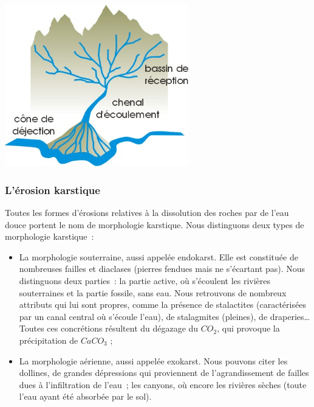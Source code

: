 \documentclass[a4paper,11pt]{article}
\begin{document}
\begin{center}
  \includegraphics[width=8cm]{Images/Erosion/torrent2.jpg}
\end{center}

\subsubsection{L'érosion karstique}

Toutes les formes d'érosions relatives à la dissolution des roches par de l'eau douce portent le nom de morphologie karstique.
Nous distinguons deux types de morphologie karstique~:
\begin{itemize}
  \item La morphologie souterraine, aussi appelée endokarst.
  Elle est constituée de nombreuses failles et diaclases (pierres fendues mais ne s'écartant pas).
  Nous distinguons deux parties~: la partie active, où s'écoulent les rivières souterraines et la partie fossile, sans eau.
  Nous retrouvons de nombreux attributs qui lui sont propres, comme la présence de stalactites (caractérisées par un canal central où s'écoule l'eau), de stalagmites (pleines), de draperies\ldots
  Toutes ces concrétions résultent du dégazage du $CO_2$, qui provoque la précipitation de $CaCO_3$ ;

  \item La morphologie aérienne, aussi appelée exokarst.
  Nous pouvons citer les dollines, de grandes dépressions qui proviennent de l'agrandissement de failles dues à l'infiltration de l'eau~; les canyons, où encore les rivières sèches (toute l'eau ayant été absorbée par le sol).
\end{itemize}
\end{document}
